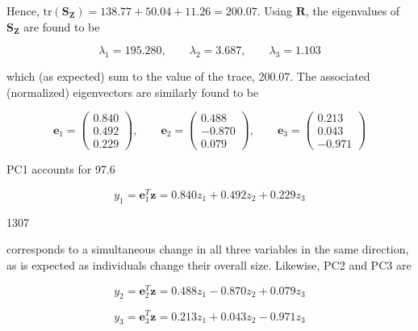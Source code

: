 \documentclass{article}
\begin{document}
Hence,  $ \mathrm{tr}(\mathbf{S}_{\mathbf{Z}})=138.77+50.04+11.26=200.07 $. Using  $ \mathbf{R} $, the eigenvalues of  $ \mathbf{S}_{\mathbf{Z}} $ are found to be

\begin{equation}
\lambda_{1}=195.280,\qquad\lambda_{2}=3.687,\qquad\lambda_{3}=1.103
\end{equation}

which (as expected) sum to the value of the trace, 200.07. The associated (normalized) eigenvectors are similarly found to be

\begin{equation}
\mathbf{e}_{1}=\begin{pmatrix}0.840\\ 0.492\\ 0.229\end{pmatrix},\qquad\mathbf{e}_{2}=\begin{pmatrix}0.488\\ -0.870\\ 0.079\end{pmatrix},\qquad\mathbf{e}_{3}=\begin{pmatrix}0.213\\ 0.043\\ -0.971\end{pmatrix}
\end{equation}

PC1 accounts for 97.6%

\begin{equation}
y_{1}=\mathbf{e}_{1}^{T}\mathbf{z}=0.840z_{1}+0.492z_{2}+0.229z_{3}
\end{equation}

1307

corresponds to a simultaneous change in all three variables in the same direction, as is expected as individuals change their overall size. Likewise, PC2 and PC3 are

\begin{equation}
y_{2}=\mathbf{e}_{2}^{T}\mathbf{z}=0.488z_{1}-0.870z_{2}+0.079z_{3}
\end{equation}

\begin{equation}
y_{3}=\mathbf{e}_{3}^{T}\mathbf{z}=0.213z_{1}+0.043z_{2}-0.971z_{3}
\end{equation}
\end{document}
